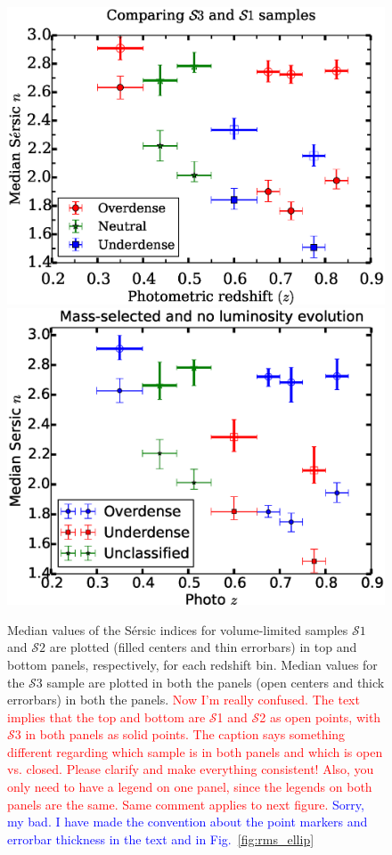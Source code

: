 \documentclass[twocolumn,useAMS,usenatbib]{mn2e}
\newcommand{\rachel}[1]{{\textcolor{red}{#1}}}
\newcommand{\arun}[1]{{\textcolor{blue}{#1}}}
\newcommand{\sersic}{S\'{e}rsic }
\newcommand{\s}{\ensuremath{\mathcal{S}}}
\begin{document}
\begin{figure}
 \includegraphics[width=1.0\columnwidth]{median_sersicn}
 \includegraphics[width=1.0\columnwidth]{median_sersicn2}
 \caption{Median values of the \sersic indices for volume-limited
   samples \s$1$ and \s$2$ are plotted (filled centers and thin
   errorbars) in top and bottom panels, respectively, for each
   redshift bin. 
          Median values for the \s$3$ sample are plotted in both the
          panels (open centers and thick errorbars) in both the
          panels.
\rachel{Now I'm really confused.  The text implies
     that the top and bottom are \s1 and \s2 as open points, with \s3 in both
     panels as solid points.  The caption says something different
     regarding which sample is in both panels and which is open
     vs. closed.  Please clarify and make everything consistent!
     Also, you only need to have a legend on one panel, since the
     legends on both panels are the same.  Same comment applies to
     next figure.} 
\arun{Sorry, my bad. I have made the convention about the point markers and errorbar thickness in the text and in Fig.~\ref{fig:rms_ellip}}     
     }
 \label{fig:median_sersicn}
\end{figure}
\end{document}
